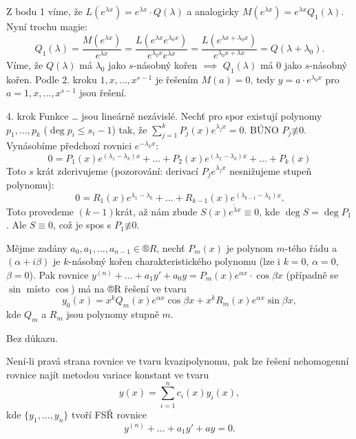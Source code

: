 \documentclass[12pt]{article}                   %
\begin{document}
\begin{veta}
\begin{dukazin}
                Z bodu 1 víme, že $L(e^{\lambda x}) = e^{\lambda x}·Q(\lambda)$ a analogicky $M(e^{\lambda x}) = e^{\lambda x} Q_1(\lambda)$. Nyní trochu magie:
                $$ Q_1(\lambda) = \frac{M(e^{\lambda x})}{e^{\lambda x}} = \frac{L(e^{\lambda x}e^{\lambda_0 x})}{e^{\lambda_0 x}e^{\lambda x}} = \frac{L(e^{\lambda x + \lambda_0 x})}{e^{\lambda_0 x + \lambda x}} = Q(\lambda + \lambda_0). $$
                Víme, že $Q(\lambda)$ má $\lambda_0$ jako $s$-násobný kořen $\implies$ $Q_1(\lambda)$ má 0 jako $s$-násobný kořen. Podle 2. kroku $1, x, …, x^{s-1}$ je řešením $M(a) = 0$, tedy $y = a·e^{\lambda_0 x}$ pro $a = 1, x, …, x^{s-1}$ jsou řešení.

                4. krok Funkce … jsou lineárně nezávislé. Nechť pro spor existují polynomy $p_1, …, p_k$ ($\deg p_i ≤ s_i - 1$) tak, že $\sum_{j=1}^k P_j(x)e^{\lambda_j x} = 0$. BÚNO $P_j \not≡ 0$. Vynásobíme předchozí rovnici $e^{- \lambda_k x}$:
                $$ 0 = P_1(x)e^{(\lambda_1 - \lambda_k)x} + … + P_2(x)e^{(\lambda_2 - \lambda_k)x} + … + P_k(x) $$
                Toto $s$ krát zderivujeme (pozorování: derivací $P_je^{\lambda_j x}$ nesnižujeme stupeň polynomu):
                $$ 0 = R_1(x)e^{\lambda_1 - \lambda_k} + … + R_{k-1}(x)e^{(\lambda_{k-1} - \lambda_k) x}. $$
                Toto provedeme $(k-1)$krát, až nám zbude $S(x)e^{\tilde{\lambda}x} ≡ 0$, kde $\deg S = \deg P_1$. Ale $S≡0$, což je spos s $P_1 \not≡ 0$.
            \end{dukazin}
        \end{veta}

        \begin{veta}
            Mějme zadány $a_0, a_1, …, a_{n-1} \in ®R$, nechť $P_m(x)$ je polynom $m$-tého řádu a $(\alpha + i\beta)$ je $k$-násobný kořen charakteristického polynomu (lze i $k = 0$, $\alpha = 0$, $\beta = 0$). Pak rovnice $y^{(n)} + … + a_1y' + a_0y = P_m(x)e^{\alpha x}·\cos \beta x$ (případně se $\sin$ místo $\cos$) má na ®R řešení ve tvaru
            $$ y_0(x) = x^kQ_m(x)e^{\alpha x}\cos \beta x + x^kR_m(x)e^{\alpha x}\sin \beta x, $$
            kde $Q_m$ a $R_m$ jsou polynomy stupně $m$.

            \begin{dukazin}
                Bez důkazu.
            \end{dukazin}
        \end{veta}

        \begin{poznamka}
            Není-li pravá strana rovnice ve tvaru kvazipolynomu, pak lze řešení nehomogenní rovnice najít metodou variace konstant ve tvaru
            $$ y(x) = \sum_{i=1}^n c_i(x)y_i(x), $$ 
            kde $\{y_1, …, y_n\}$ tvoří FSŘ rovnice
            $$ y^{(n)} + … + a_1y' + ay = 0. $$ 
        \end{poznamka}
\end{document}
